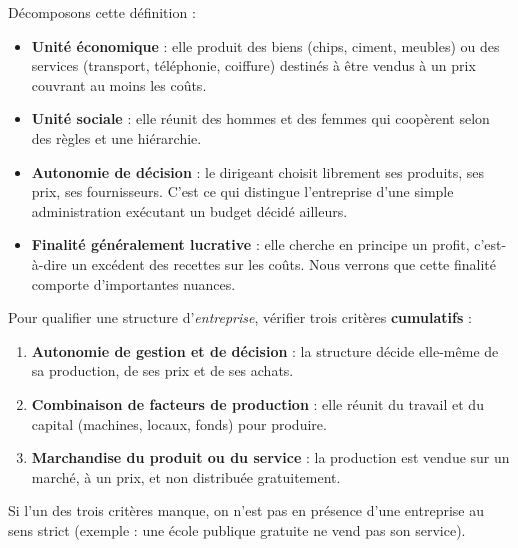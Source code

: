 \documentclass[11pt]{article}
\newcommand{\cle}[1]{{\popxbold\color{popdark}#1}}
\begin{document}
Décomposons cette définition :
\begin{itemize}
\item \textbf{Unité économique} : elle produit des biens (chips, ciment, meubles) ou des services (transport, téléphonie, coiffure) destinés à être vendus à un prix couvrant au moins les coûts.
\item \textbf{Unité sociale} : elle réunit des hommes et des femmes qui coopèrent selon des règles et une hiérarchie.
\item \textbf{Autonomie de décision} : le dirigeant choisit librement ses produits, ses prix, ses fournisseurs. C'est ce qui distingue l'entreprise d'une simple administration exécutant un budget décidé ailleurs.
\item \textbf{Finalité généralement lucrative} : elle cherche en principe un \cle{profit}, c'est-à-dire un excédent des recettes sur les coûts. Nous verrons que cette finalité comporte d'importantes nuances.
\end{itemize}

\begin{methode}
Pour qualifier une structure d'\emph{entreprise}, vérifier trois critères \textbf{cumulatifs} :
\begin{enumerate}
\item \textbf{Autonomie de gestion et de décision} : la structure décide elle-même de sa production, de ses prix et de ses achats.
\item \textbf{Combinaison de facteurs de production} : elle réunit du travail et du capital (machines, locaux, fonds) pour produire.
\item \textbf{Marchandise du produit ou du service} : la production est vendue sur un marché, à un prix, et non distribuée gratuitement.
\end{enumerate}
Si l'un des trois critères manque, on n'est pas en présence d'une entreprise au sens strict (exemple : une école publique gratuite ne vend pas son service).
\end{methode}
\end{document}
